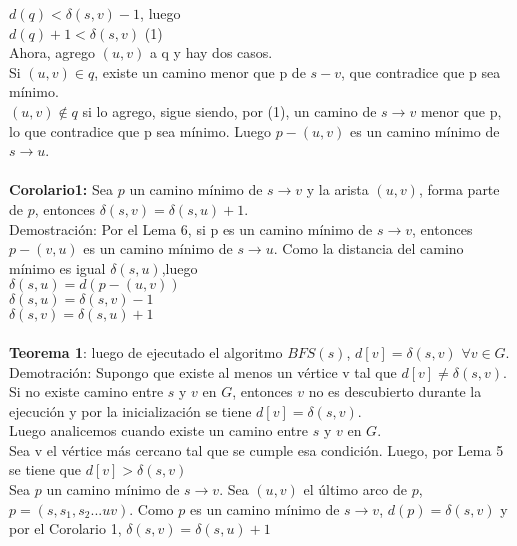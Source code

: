 \documentclass[12pt]{article}
\begin{document}
$d(q) < \delta(s,v) - 1$, luego\\
$d (q) + 1 < \delta (s, v)$ (1)\\
Ahora, agrego $(u,v)$ a q y hay dos casos.\\ 
Si $(u,v) \in q$, existe un camino menor que p de $s-v$, que contradice que p sea m\'inimo. \\
$(u, v) \notin q$ si lo agrego, sigue siendo, por (1), un camino de $s \rightarrow v$ menor que p, lo que contradice que p sea  m\'inimo. Luego $p - (u,v)$ es un camino m\'inimo de $s\rightarrow u$.\\
\\
\textbf{Corolario1:} Sea $p$ un camino m\'inimo de $s \rightarrow v$ y la arista $(u, v)$, forma parte de $p$, entonces $\delta (s,v) = \delta (s, u)+ 1$. \\
Demostraci\'on: 
Por el Lema 6, si p es un camino m\'inimo de $s \rightarrow v$, entonces $p - (v, u)$ es un camino m\'inimo de $s \rightarrow u$. Como la distancia del camino
 m\'inimo es igual $\delta (s,u)$,luego\\

$\delta (s,u) = d (p - (u, v))$\\
$\delta (s, u) = \delta (s, v) - 1$\\
$\delta (s, v) = \delta (s, u) + 1$\\
\\

\textbf{Teorema 1}: luego de ejecutado el algoritmo $BFS(s)$,  $d[v] = \delta (s,v)$ $\forall v \in G$.\\

Demotraci\'on:
 Supongo que existe al menos un v\'ertice v tal que $d[v] \neq \delta (s,v)$.\\
 Si no existe camino entre $s$ y $v$ en $G$, entonces $v$ no es descubierto durante la ejecuci\'on y por la inicializaci\'on se tiene $d[v] = \delta(s,v)$.\\
 Luego analicemos cuando existe un camino entre $s$ y $v$ en $G$.\\  

Sea v el v\'ertice m\'as cercano tal que se cumple esa condici\'on. Luego, por Lema 5 se tiene que $d[v] >  \delta (s,v)$\\

Sea $p$ un camino m\'inimo de $s\rightarrow v$. Sea $(u, v)$ el \'ultimo arco  de $p$, $p=(s,s_1, s_2... uv)$.  Como $p$ es un camino m\'inimo de $s \rightarrow v$, 
 $d(p) = \delta (s, v)$ y por el Corolario 1, $\delta(s,v) =\delta(s,u)+1 $  \\
\end{document}
